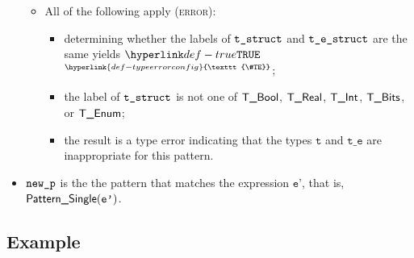 \documentclass{book}
\newcommand\TypeErrorConfig[0]{\hyperlink{def-typeerrorconfig}{\texttt{\#TE}}}
\newcommand\ProseOrTypeError[0]{\hyperlink{def-proseortypeerror}{$^{\TypeErrorConfig}$}}
\newcommand\vt[0]{\texttt{t}}
\newcommand\vte[0]{\texttt{t\_e}}
\newcommand\vep[0]{\texttt{e'}}
\begin{document}
\begin{itemize}
\begin{itemize}
    \item All of the following apply (\textsc{error}):
    \begin{itemize}
      \item determining whether the labels of $\texttt{t\_struct}$ and $\texttt{t\_e\_struct}$ are the same yields $\True$ \ProseOrTypeError;
      \item the label of $\texttt{t\_struct}$ is not one of $\textsf{T\_Bool}$, $\textsf{T\_Real}$, $\textsf{T\_Int}$, $\textsf{T\_Bits}$, or $\textsf{T\_Enum}$;
      \item the result is a type error indicating that the types $\vt$ and $\vte$ are inappropriate for this pattern.
    \end{itemize}
  \end{itemize}
  \item $\texttt{new\_p}$ is the the pattern that matches the expression $\vep$, that is, $\PatternSingle(\vep)$.
\end{itemize}

\subsection{Example}

\end{document}
